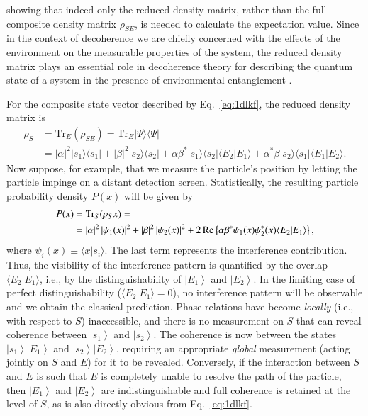 \documentclass[3p,sort&compress]{elsarticle}
\newcommand{\ket}[1]{\left\vert{#1}\right\rangle}
\newcommand{\braket}[2]{\ensuremath{{\langle #1}|{#2 \rangle}}}
\newcommand{\ketbra}[2]{\ensuremath{|{#1 \rangle}{\langle #2}|}}
\providecommand{\abs}[1]{\left\lvert#1\right\rvert}
\newcommand{\op}[1]{#1}
\begin{document}
%
showing that indeed only the reduced density matrix, rather than the full composite density matrix $\op{\rho}_{SE}$, is needed to calculate the expectation value. Since in the context of decoherence we are chiefly concerned with the effects of the environment on the measurable properties of the system, the reduced density matrix  plays an essential role in decoherence theory for describing the quantum state of a system in the presence of environmental entanglement \cite{Zurek:1981:dd,Zurek:1982:tv,Schlosshauer:2007:un}. 

For the composite state vector described by Eq.~\eqref{eq:1dlkf}, the reduced density matrix is \cite{Schlosshauer:2007:un}
%
\begin{align}
  \label{eq:aa12}
 \op{\rho}_S &= \text{Tr}_E(\op{\rho}_{SE}) =\text{Tr}_E \ketbra{\Psi}{\Psi} \nonumber \\
 &= \abs{\alpha}^2
    \ketbra{s_1}{s_1} + \abs{\beta}^2 \ketbra{s_2}{s_2} + \alpha \beta^*\ketbra{s_1}{s_2}
      \braket{E_2}{E_1} +  \alpha^*\beta\ketbra{s_2}{s_1}
      \braket{E_1}{E_2}.
\end{align}
%
Now suppose, for example, that we measure the particle's position by letting the particle impinge on a distant detection screen. Statistically, the resulting particle probability density $P(x)$ will be given by
%
\begin{align}\label{eq:fdljksjk2}
P(x) & = \text{Tr}_S(\op{\rho}_S x) = \notag \\ &= \abs{\alpha}^2
\abs{\psi_1(x)}^2 +\abs{\beta}^2 \abs{\psi_2(x)}^2 + 2 \,\text{Re} \left\{\alpha \beta^* \psi_1(x) \psi_2^*(x)\braket{E_2}{E_1} \right\},
\end{align}
%
where $\psi_i(x) \equiv \braket{x}{s_i}$. The last term represents the interference contribution. Thus, the visibility of the interference pattern is quantified by the overlap $\braket{E_2}{E_1}$, i.e., by the distinguishability of $\ket{E_1}$ and $\ket{E_2}$. In the limiting case of perfect distinguishability ($\braket{E_2}{E_1} = 0$), no interference pattern will be observable and we obtain the classical prediction. Phase relations have become \emph{locally} (i.e., with respect to $S$) inaccessible, and there is no measurement on $S$ that can reveal coherence between $\ket{s_1}$ and $\ket{s_2}$. The coherence is now between the states  $\ket{s_1} \ket{E_1}$ and $\ket{s_2} \ket{E_2}$, requiring an appropriate \emph{global} measurement (acting jointly on $S$ and $E$) for it to be revealed. Conversely, if the interaction between $S$ and $E$ is such that $E$ is completely unable to resolve the path of the particle, then $\ket{E_1}$ and $\ket{E_2}$ are indistinguishable and full coherence is retained at the level of $S$, as is also directly obvious from Eq.~\eqref{eq:1dlkf}. 
\end{document}
